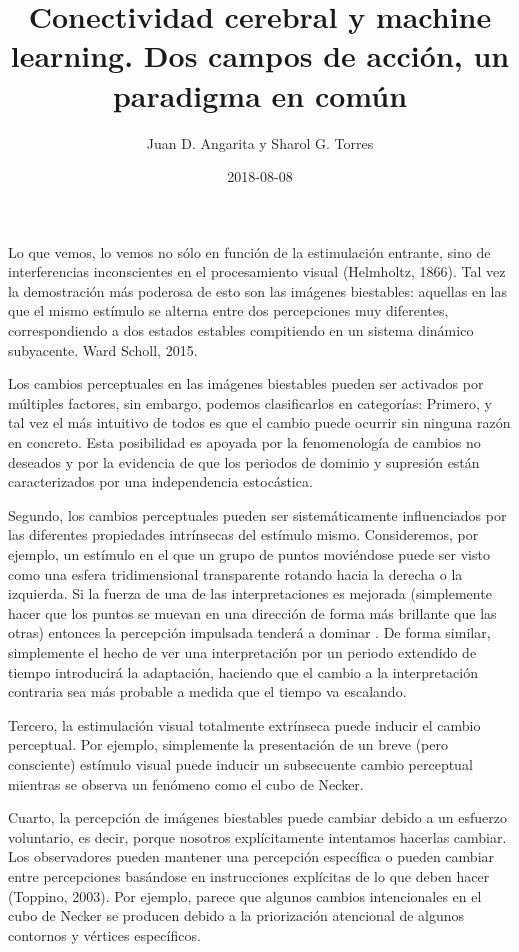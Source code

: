 \documentclass[jou]{apa6}
\title{Conectividad cerebral y machine learning. Dos campos de acción, un paradigma en común}
\author{Juan D. Angarita y Sharol G. Torres}
\affiliation{Universidad Popular del Cesar}
\date{2018-08-08}
\begin{document}
\maketitle

Lo que vemos, lo vemos no sólo en función de la estimulación entrante, sino de
interferencias inconscientes en el procesamiento visual (Helmholtz, 1866). Tal vez la
demostración más poderosa de esto son las imágenes biestables: aquellas en las que el mismo
estímulo se alterna entre dos percepciones muy diferentes, correspondiendo a dos estados 
estables compitiendo en un sistema dinámico subyacente. Ward Scholl, 2015.

Los cambios perceptuales en las imágenes biestables pueden ser activados por múltiples
factores, sin embargo, podemos clasificarlos en categorías: Primero, y tal vez el más intuitivo
de todos es que el cambio puede ocurrir sin ninguna razón en concreto. Esta posibilidad es
apoyada por la fenomenología de cambios no deseados y por la evidencia de que los periodos
de dominio y supresión están caracterizados por una independencia estocástica.

Segundo, los cambios perceptuales pueden ser sistemáticamente influenciados por las
diferentes propiedades intrínsecas del estímulo mismo. Consideremos, por ejemplo, un
estímulo en el que un grupo de puntos moviéndose puede ser visto como una esfera
tridimensional transparente rotando hacia la derecha o la izquierda. Si la fuerza de una de las
interpretaciones es mejorada (simplemente hacer que los puntos se muevan en una dirección
de forma más brillante que las otras) entonces la percepción impulsada tenderá a dominar
. De forma similar, simplemente el hecho de ver una
interpretación por un periodo extendido de tiempo introducirá la adaptación, haciendo que el
cambio a la interpretación contraria sea más probable a medida que el tiempo va escalando.

Tercero, la estimulación visual totalmente extrínseca puede inducir el cambio perceptual.
Por ejemplo, simplemente la presentación de un breve (pero consciente) estímulo visual
puede inducir un subsecuente cambio perceptual mientras se observa un fenómeno como el
cubo de Necker.

Cuarto, la percepción de imágenes biestables puede cambiar debido a un esfuerzo
voluntario, es decir, porque nosotros explícitamente intentamos hacerlas cambiar. Los
observadores pueden mantener una percepción específica o pueden cambiar entre
percepciones basándose en instrucciones explícitas de lo que deben hacer (Toppino, 2003).
Por ejemplo, parece que algunos cambios intencionales en el cubo de Necker se producen
debido a la priorización atencional de algunos contornos y vértices específicos.
\end{document}
